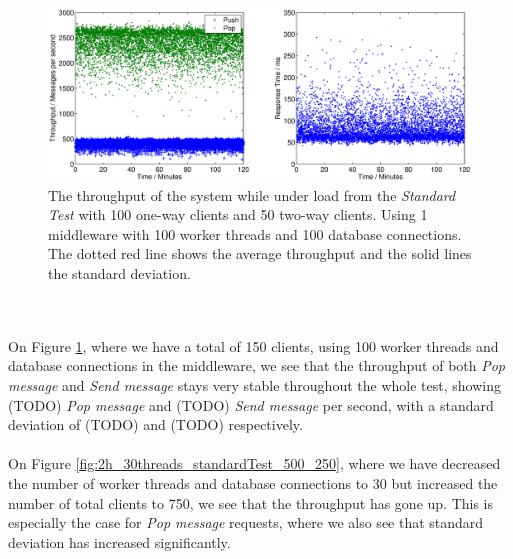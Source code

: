 \documentclass{article}
\begin{document}
            \begin{figure}[H]
                \hspace{-1.5cm}
                \includegraphics[scale=0.750]{2h_100threads_standardTest_100_50}
                \caption{The throughput of the system while under load from the \textit{Standard Test} with 100 one-way clients and 50 two-way clients. Using 1 middleware with 100 worker threads and 100 database connections. The dotted red line shows the average throughput and the solid lines the standard deviation.}
                \label{fig:2h_100threads_standardTest_100_50}
            \end{figure}
            ~\\
            \\
            On Figure \ref{fig:2h_100threads_standardTest_100_50}, where we have a total of 150 clients, using 100 worker threads and database connections in the middleware, we see that the throughput of both \textit{Pop message} and \textit{Send message} stays very stable throughout the whole test, showing (TODO) \textit{Pop message} and (TODO) \textit{Send message} per second, with a standard deviation of (TODO) and (TODO) respectively.\\
            \\
            On Figure \ref{fig:2h_30threads_standardTest_500_250}, where we have decreased the number of worker threads and database connections to 30 but increased the number of total clients to 750, we see that the throughput has gone up. This is especially the case for \textit{Pop message} requests, where we also see that standard deviation has increased significantly.
\end{document}
